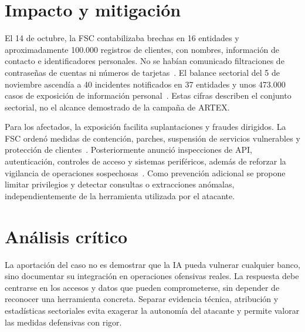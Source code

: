 \section{Impacto y mitigación}
El 14 de octubre, la FSC contabilizaba brechas en
16 entidades y aproximadamente 100.000 registros
de clientes, con nombres, información de contacto
e identificadores personales. No se habían comunicado
filtraciones de contraseñas de cuentas ni números
de tarjetas~\cite{fsc2026octubre}.
El balance sectorial del 5 de noviembre ascendía
a 40 incidentes notificados en 37 entidades y unos
473.000 casos de exposición de información
personal~\cite{fsc2026noviembre}.
Estas cifras describen el conjunto sectorial, no
el alcance demostrado de la campaña de ARTEX.

Para los afectados, la exposición facilita
suplantaciones y fraudes dirigidos.
La FSC ordenó medidas de contención, parches,
suspensión de servicios vulnerables y protección
de clientes~\cite{fsc2026octubre}.
Posteriormente anunció inspecciones de API,
autenticación, controles de acceso y sistemas
periféricos, además de reforzar la vigilancia
de operaciones sospechosas~\cite{fsc2026noviembre}.
Como prevención adicional se propone limitar
privilegios y detectar consultas o extracciones
anómalas, independientemente de la herramienta
utilizada por el atacante.

\section{Análisis crítico}
La aportación del caso no es demostrar que la IA
pueda vulnerar cualquier banco, sino documentar
su integración en operaciones ofensivas reales.
La respuesta debe centrarse en los accesos y datos
que pueden comprometerse, sin depender de reconocer
una herramienta concreta.
Separar evidencia técnica, atribución y estadísticas
sectoriales evita exagerar la autonomía del atacante
y permite valorar las medidas defensivas con rigor.